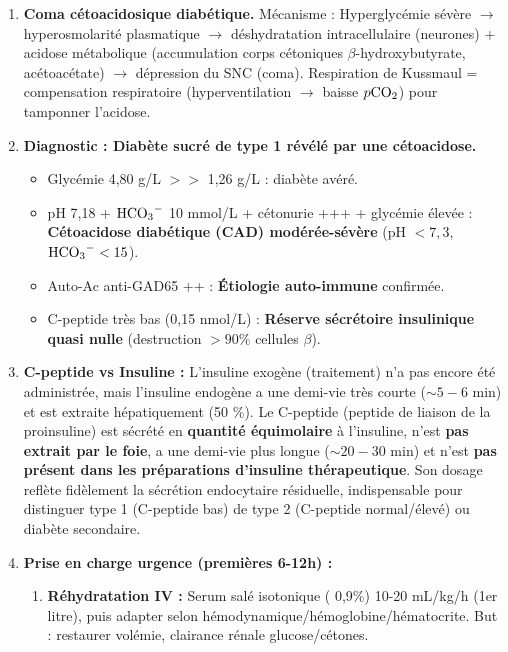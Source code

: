 \documentclass[11pt]{article}
\begin{document}
\begin{corrige}[Exercice n]
\begin{enumerate}
    \item \textbf{Coma cétoacidosique diabétique.} Mécanisme : Hyperglycémie sévère $\rightarrow$ hyperosmolarité plasmatique $\rightarrow$ déshydratation intracellulaire (neurones) + acidose métabolique (accumulation corps cétoniques $\beta$-hydroxybutyrate, acétoacétate) $\rightarrow$ dépression du SNC (coma). Respiration de Kussmaul = compensation respiratoire (hyperventilation $\rightarrow$ baisse $p\ce{CO2}$) pour tamponner l'acidose.
    \item \textbf{Diagnostic : Diabète sucré de type 1 révélé par une cétoacidose.}
    \begin{itemize}
        \item Glycémie 4,80 g/L $>>$ 1,26 g/L : diabète avéré.
        \item pH 7,18 + $\ce{HCO3-}$ 10 mmol/L + cétonurie +++ + glycémie élevée : \textbf{Cétoacidose diabétique (CAD) modérée-sévère} (pH $< 7,3$, $\ce{HCO3-} < 15$).
        \item Auto-Ac anti-GAD65 ++ : \textbf{Étiologie auto-immune} confirmée.
        \item C-peptide très bas (0,15 nmol/L) : \textbf{Réserve sécrétoire insulinique quasi nulle} (destruction $> 90\%$ cellules $\beta$).
    \end{itemize}
    \item \textbf{C-peptide vs Insuline :} L'insuline exogène (traitement) n'a pas encore été administrée, mais l'insuline endogène a une demi-vie très courte ($\sim 5-6$ min) et est extraite hépatiquement (50 \%). Le C-peptide (peptide de liaison de la proinsuline) est sécrété en \textbf{quantité équimolaire} à l'insuline, n'est \textbf{pas extrait par le foie}, a une demi-vie plus longue ($\sim 20-30$ min) et n'est \textbf{pas présent dans les préparations d'insuline thérapeutique}. Son dosage reflète fidèlement la sécrétion endocytaire résiduelle, indispensable pour distinguer type 1 (C-peptide bas) de type 2 (C-peptide normal/élevé) ou diabète secondaire.
    \item \textbf{Prise en charge urgence (premières 6-12h) :}
    \begin{enumerate}
        \item \textbf{Réhydratation IV :} Serum salé isotonique ( 0,9\%) 10-20 mL/kg/h (1er litre), puis adapter selon hémodynamique/hémoglobine/hématocrite. But : restaurer volémie, clairance rénale glucose/cétones.

\end{enumerate}
\end{enumerate}
\end{corrige}
\end{document}
